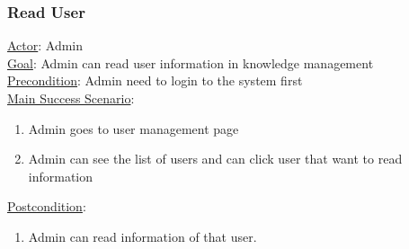 \documentclass[12pt,oneside,openright,a4paper]{cpe-english-project}
\begin{document}
	\subsubsection{Read User}
	\underline{Actor}: Admin\\
	\underline{Goal}: Admin can read user information in knowledge management\\
	\underline{Precondition}: Admin need to login to the system first\\
	\underline{Main Success Scenario}:
	\begin{enumerate}[label={\arabic*.}]
		\item Admin goes to user management page
		\item Admin can see the list of users and can click user that want to read information
	\end{enumerate}
	\underline{Postcondition}: 
	\begin{enumerate}[label={\arabic*.}]
		\item Admin can read information of that user.
	\end{enumerate}
\end{document}
